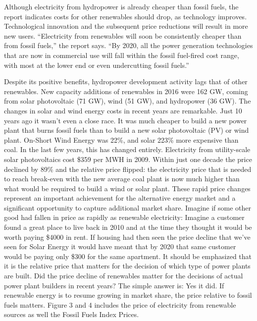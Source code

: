 \documentclass[10pt,twocolumn,letterpaper]{article}
\begin{document}
Although electricity from hydropower is already cheaper than fossil fuels, the report indicates costs for other renewables should drop, as technology improves. Technological innovation and the subsequent price reductions will result in more new users.  “Electricity from renewables will soon be consistently cheaper than from fossil fuels,” the report says. “By 2020, all the power generation technologies that are now in commercial use will fall within the fossil fuel-fired cost range, with most at the lower end or even undercutting fossil fuels.” 

Despite its positive benefits, hydropower development activity lags that of other renewables. New capacity additions of renewables in 2016 were 162 GW, coming from solar photovoltaic (71 GW), wind (51 GW),  and hydropower (36 GW).
The changes in solar and wind energy costs in recent years are remarkable.  Just 10 years ago it wasn’t even a close race. It was much cheaper to build a new power plant that burns fossil fuels than to build a new solar photovoltaic (PV) or wind plant. On-Short Wind Energy was 22\%, and solar 223\% more expensive than coal.
In the last few years, this has changed entirely.
Electricity from utility-scale solar photovoltaics cost \$359 per MWH in 2009. Within just one decade the price declined by 89\% and the relative price flipped: the electricity price that is needed to reach break-even with the new average coal plant is now much higher than what would be required to build a wind or solar plant.
These rapid price changes represent an important achievement for the alternative energy market and a significant opportunity to capture additional market share. Imagine if some other good had fallen in price as rapidly as renewable electricity: Imagine a customer found a great place to live back in 2010 and at the time they thought it would be worth paying \$4000 in rent. If housing had then seen the price decline that we’ve seen for Solar Energy it would have meant that by 2020 that same customer would be paying only \$300 for the same apartment.
It should be emphasized that it is the relative price that matters for the decision of which type of power plants are built. Did the price decline of renewables matter for the decisions of actual power plant builders in recent years? The simple answer is: Yes it did.
If renewable energy is to resume growing in market share, the price relative to fossil fuels matters. Figure 3 and 4 includes the price of electricity from renewable sources as well the Fossil Fuels Index Prices.
\end{document}
